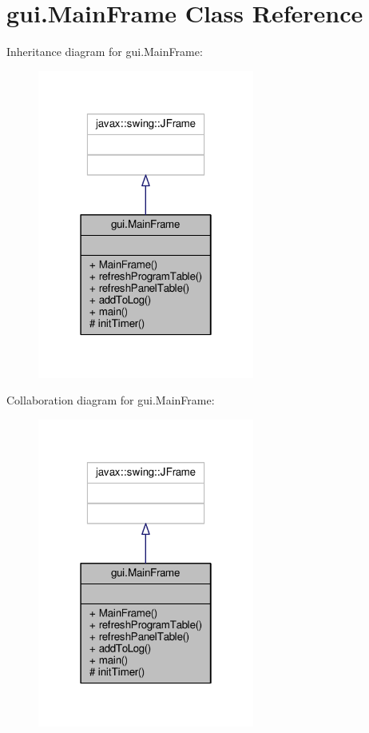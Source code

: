 \hypertarget{classgui_1_1MainFrame}{\section{gui.\-Main\-Frame Class Reference}
\label{classgui_1_1MainFrame}
}


Inheritance diagram for gui.\-Main\-Frame\-:\nopagebreak
\begin{figure}[H]
\begin{center}
\leavevmode
\includegraphics[width=202pt]{classgui_1_1MainFrame__inherit__graph}
\end{center}
\end{figure}


Collaboration diagram for gui.\-Main\-Frame\-:\nopagebreak
\begin{figure}[H]
\begin{center}
\leavevmode
\includegraphics[width=202pt]{classgui_1_1MainFrame__coll__graph}
\end{center}
\end{figure}
